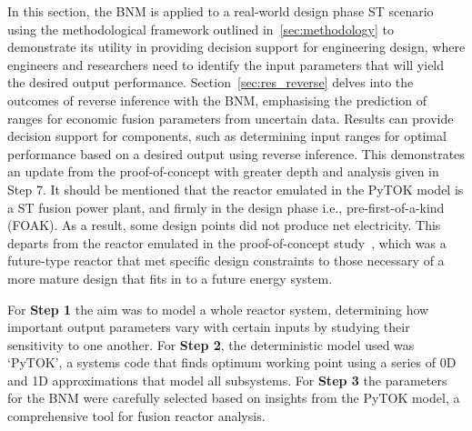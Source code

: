 \documentclass[journal]{IEEEtran}
\begin{document}
In this section, the BNM is applied to a real-world design phase ST scenario using the methodological framework outlined in~\ref{sec:methodology} to demonstrate its utility in providing decision support for engineering design, where engineers and researchers need to identify the input parameters that will yield the desired output performance. Section~\ref{sec:res_reverse} delves into the outcomes of reverse inference with the BNM, emphasising the prediction of ranges for economic fusion parameters from uncertain data. Results can provide decision support for components, such as determining input ranges for optimal performance based on a desired output using reverse inference. This demonstrates an update from the proof-of-concept with greater depth and analysis given in Step 7. It should be mentioned that the reactor emulated in the PyTOK model is a ST fusion power plant, and firmly in the design phase i.e., pre-first-of-a-kind (FOAK). As a result, some design points did not produce net electricity. This departs from the reactor emulated in the proof-of-concept study~\cite{Griffiths2024}, which was a future-type reactor that met specific design constraints to those necessary of a more mature design that fits in to a future energy system.

For \textbf{Step 1} the aim was to model a whole reactor system, determining how important output parameters vary with certain inputs by studying their sensitivity to one another. For \textbf{Step 2}, the deterministic  model used was `PyTOK', a systems code that finds optimum working point using a series of 0D and 1D approximations that model all subsystems. For \textbf{Step 3} the parameters for the BNM were carefully selected based on insights from the PyTOK model, a comprehensive tool for fusion reactor analysis.
\end{document}
